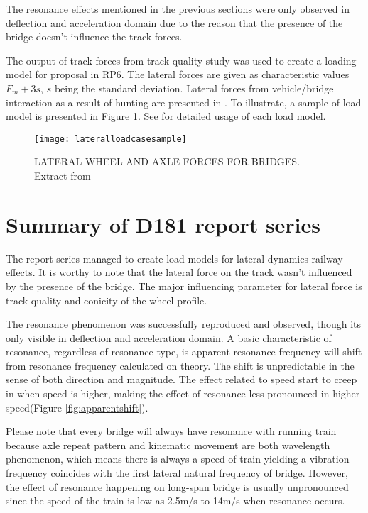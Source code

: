\begin{appendices}
The resonance effects mentioned in the previous sections were only observed in deflection and acceleration domain due to the reason that the presence of the bridge doesn't influence the track forces. 

The output of track forces from track quality study was used to create a loading model for proposal in RP6. The lateral forces are given as characteristic values $F_m + 3s$, $s$ being the standard deviation. Lateral forces from vehicle/bridge interaction as a result of hunting are presented in \cite[Page 33]{d181}. To illustrate, a sample of load model is presented in Figure \ref{fig:lateralloadcasesample}. See \cite[Page 33]{d181} for detailed usage of each load model. 

\begin{figure}[h]
    \centering
    \texttt{[image: lateralloadcasesample]}
    \caption{LATERAL WHEEL AND AXLE FORCES FOR BRIDGES. Extract from \cite[Fig 3.1]{d181}}
    \label{fig:lateralloadcasesample}
\end{figure}


\section{Summary of D181 report series}
The report series managed to create load models for lateral dynamics railway effects. It is worthy to note that the lateral force on the track wasn't influenced by the presence of the bridge. The major influencing parameter for lateral force is track quality and conicity of the wheel profile. 

The resonance phenomenon was successfully reproduced and observed, though its only visible in deflection and acceleration domain. A basic characteristic of resonance, regardless of resonance type, is apparent resonance frequency will shift from resonance frequency calculated on theory. The shift is unpredictable in the sense of both direction and magnitude. The effect related to speed start to creep in when speed is higher, making the effect of resonance less pronounced in higher speed(Figure \ref{fig:apparentshift}). 

Please note that every bridge will always have resonance with running train because axle repeat pattern and kinematic movement are both wavelength phenomenon, which means there is always a speed of train yielding a vibration frequency coincides with the first lateral natural frequency of bridge. However, the effect of resonance happening on long-span bridge is usually unpronounced since the speed of the train is low as 2.5m/s to 14m/s when resonance occurs.  


\end{appendices}

